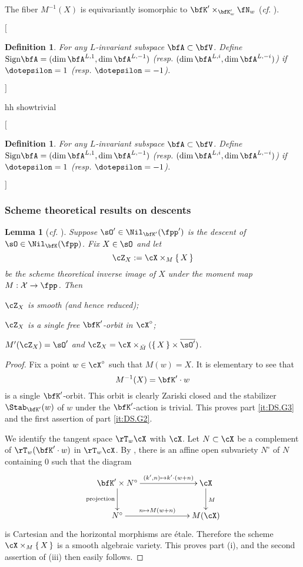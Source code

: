 \documentclass[12pt,a4paper]{amsart}
\makeatletter
\newcommand*{\circnuma}[1]{%
  \ifnum#1<1 %
    \@ctrerr
  \else
    \ifnum#1>20 %
      \@ctrerr
    \else
      \mbox{\ding{\numexpr 171+(#1)\relax}}%
     \fi
  \fi
}
\newcommand{\trivial}[2][]{\if\relax\detokenize{#1}\relax
  {%
      \color{orange} \vspace{0em} $[$  #2 $]$
      \color{black}
  }
  \else
\ifx#1h
\ifcsname showtrivial\endcsname
{%
    \color{orange} \vspace{0em}  $[$ #2 $]$
    \color{black}
}
\fi
\else {\red Wrong argument!} \fi
\fi
}
\newcommand{\CX}{{\mathcal {X}}}
\numberwithin{equation}{section}
\newtheorem{lem}[thm]{Lemma}
\newtheorem{defn}[thm]{Definition}
\theoremstyle{remark}
\def\MMP{M}
\def\Xo{\cX^\circ}
\def\ssign{\mathrm{Sign}}
\def\ZX{\cZ_{X}}
\def\bsOp{\overline{\sO'}}
\def\cf{\emph{cf.} }
\makeatother
\begin{document}
{  The fiber $M^{-1}(X)$ is equivariantly isomorphic to
  $\bfK'\times_{\bfK'_w}\fN_w$ (\emph{cf}.  \cite[Theorem~6.6]{PV}).


\trivial[h]{
  \medskip


\begin{defn}
  For any $L$-invariant subspace $\bfA \subset \bfV$.  Define
  $\ssign\bfA = (\dim \bfA^{L,1}, \dim \bfA^{L,-1})$ (resp.
$(\dim \bfA^{L,i}, \dim \bfA^{L,-i})$) if $\dotepsilon=1$ (resp.
$\dotepsilon = -1$).
\end{defn}
}
}


\subsubsection{Scheme theoretical results on descents}\label{sec:Sdes}


\begin{lem}[{\cf \cite[Lemma~13 and Lemma 14]{Ohta}}]\label{lem:DS.sh}
Suppose $\sO'\in \Nil_{\bfK'}(\fpp')$ is the descent of $\sO\in \Nil_\bfK(\fpp)$.
Fix $X\in \sO$ and
let
\[
\ZX := \cX\times_{M}\set{X}
\]
be the scheme theoretical
inverse image of $X$ under the moment map $M: \CX\rightarrow \fpp$. Then
\begin{enumT}
\item\label{it:DS.G1} $\ZX$ is smooth (and hence reduced);
\item\label{it:DS.G3}   $\ZX$ is
  a single free $\bfK'$-orbit in $\Xo$;
\item\label{it:DS.G2}$M'(\ZX) = \sO'$ and $\ZX = \cX\times_{\dbM}( \set{X} \times\bsOp)$.
\end{enumT}
\end{lem}
 \begin{proof}
  Fix a point  $w\in \cX^\circ$ such that $M(w)=X$. It is elementary to see that
  \[
  M^{-1}(X)=\bfK'\cdot w
  \]
  is a single $\bfK'$-orbit. This orbit is clearly Zariski closed and the
  stabilizer $\Stab_{\bfK'}(w)$ of $w$ under the $\bfK'$-action is trivial. This
  proves part \cref{it:DS.G3} and the first assertion of part \cref{it:DS.G2}.

  We identify the tangent space $\rT_w\cX$ with $\cX$.  Let $N\subset \cX$
be a complement of $\rT_w (\bfK'\cdot w)$ in $\rT_w \cX$.
By \cite[Section~6.3]{PV}, there is an affine open subvariety $N^\circ$ of $N$ containing $0$ such that  the diagram
\[\label{dg:FR}
    \xymatrix@C=6em{
      \bfK' \times N^\circ \ar[r]^<>(.5){(k',n)\mapsto k'\cdot (w+n)} \ar[d]_<>(.5){\text{projection}}& \cX \ar[d]^{\MMP}\\
    N^\circ \ar[r]^<>(.5){n\mapsto M(w+n)}&  \MMP(\cX)
     }
\]
is  Cartesian and the
horizontal morphisms are \'etale. Therefore the scheme $\cX\times_M\set{X}$ is a smooth algebraic variety. This proves part (i), and the second assertion of (iii) then easily follows.
\end{proof}
\end{document}
